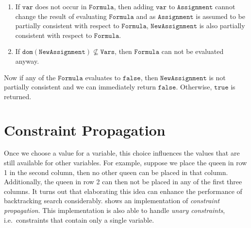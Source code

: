 \begin{enumerate}
\begin{enumerate}
      \item If $\mathtt{var}$ does not occur in $\mathtt{Formula}$, then adding $\mathtt{var}$ to
            $\mathtt{Assignment}$ cannot change the result of evaluating $\mathtt{Formula}$ and as
            $\mathtt{Assignment}$ is assumed to be partially consistent with respect to $\mathtt{Formula}$, 
            $\mathtt{NewAssignment}$ is also partially consistent with respect to $\mathtt{Formula}$.
      \item If $\mathtt{dom}(\mathtt{NewAssignment}) \not\subseteq \mathtt{Vars}$, then $\mathtt{Formula}$ can not be evaluated anyway.
      \end{enumerate}
      Now if any of the $\mathtt{Formula}$ evaluates to $\mathtt{false}$, then $\mathtt{NewAssignment}$ is not
      partially consistent and we can immediately return $\mathtt{false}$.  Otherwise, $\mathtt{true}$ is returned.
\end{enumerate}  

\section{Constraint Propagation}
Once we choose a value for a variable, this choice influences the values that are still available for other variables.
For example, suppose we place the queen in row 1 in the second column, then no other queen can be placed in
that column.   Additionally, the queen in row 2 can then not be placed in any of the first three columns.
It turns out that elaborating this idea can enhance the performance of backtracking search considerably.
 shows an implementation of \emph{\color{blue}constraint propagation}.
This implementation is also able to handle \emph{\color{blue}unary constraints}, i.e.~constraints that contain
only a single variable.

